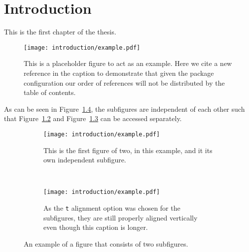 \chapter{Introduction}\label{chapter:introduction}

This is the first chapter of the \gls{thesis}.~\cite{Aaboud:2016mmw,Bruning:782076}

\begin{figure}[htpb]
 \centering
 \texttt{[image: introduction/example.pdf]}
 \caption{This is a placeholder figure to act as an example.
  Here we cite a new reference in the caption to demonstrate that given the package configuration our order of references will not be distributed by the table of contents.~\cite{Higgs:1964ia}}\label{fig:test_figure}
\end{figure}

As can be seen in Figure~\ref{fig:subfigure_example}, the subfigures are independent of each other such that Figure~\ref{fig:subfigure_1} and Figure~\ref{fig:subfigure_2} can be accessed separately.

\begin{figure}[htbp]
 \centering
 \begin{subfigure}[t]{0.5\textwidth}
  \centering
  \texttt{[image: introduction/example.pdf]}
  \caption{This is the first figure of two, in this example, and it its own independent subfigure.}
  \label{fig:subfigure_1}
 \end{subfigure}%
 ~
 \begin{subfigure}[t]{0.5\textwidth}
  \centering
  \texttt{[image: introduction/example.pdf]}
  \caption{As the \texttt{t} alignment option was chosen for the subfigures, they are still properly aligned vertically even though this caption is longer.}
  \label{fig:subfigure_2}
 \end{subfigure}
 \caption{An example of a figure that consists of two subfigures.}
 \label{fig:subfigure_example}
\end{figure}
